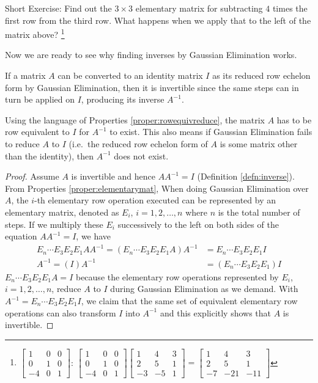 Short Exercise: Find out the $3 \times 3$ elementary matrix for subtracting $4$ times the first row from the third row. What happens when we apply that to the left of the matrix above? \footnote{$
\begin{bmatrix}
1 & 0 & 0 \\
0 & 1 & 0 \\
-4 & 0 & 1
\end{bmatrix}
$: $\begin{bmatrix}
1 & 0 & 0 \\
0 & 1 & 0 \\
-4 & 0 & 1
\end{bmatrix}
\begin{bmatrix}
1 & 4 & 3 \\
2 & 5 & 1 \\
-3 & -5 & 1
\end{bmatrix}
=
\begin{bmatrix}
1 & 4 & 3 \\
2 & 5 & 1 \\
-7 & -21 & -11
\end{bmatrix}
$}\par
Now we are ready to see why finding inverses by Gaussian Elimination works.
\begin{thm}
\label{thm:Gausselimprincip}
If a matrix $A$ can be converted to an identity matrix $I$ as its reduced row echelon form by Gaussian Elimination, then it is invertible since the same steps can in turn be applied on $I$, producing its inverse $A^{-1}$. 
\end{thm}
Using the language of Properties \ref{proper:rowequivreduce}, the matrix $A$ has to be row equivalent to $I$ for $A^{-1}$ to exist. This also means if Gaussian Elimination fails to reduce $A$ to $I$ (i.e.\ the reduced row echelon form of $A$ is some matrix other than the identity), then $A^{-1}$ does not exist.
\begin{proof}
Assume $A$ is invertible and hence $AA^{-1} = I$ (Definition \ref{defn:inverse}). From Properties \ref{proper:elementarymat}, When doing Gaussian Elimination over $A$, the $i$-th elementary row operation executed can be represented by an elementary matrix, denoted as $E_{i}$, $i = 1,2,\ldots,n$ where $n$ is the total number of steps. If we multiply these $E_{i}$ successively to the left on both sides of the equation $AA^{-1} = I$, we have
\begin{align*}
E_n \cdots E_{3}E_{2}E_{1} AA^{-1} = (E_n \cdots E_{3}E_{2}E_{1}A) A^{-1} &= E_n \cdots E_{3}E_{2}E_{1}I \\
A^{-1} = (I)A^{-1} &= (E_n \cdots E_{3}E_{2}E_{1})I
\end{align*}
$E_n \cdots E_{3}E_{2}E_{1}A = I$ because the elementary row operations represented by $E_i$, $i = 1,2,\ldots,n$, reduce $A$ to $I$ during Gaussian Elimination as we demand. With $A^{-1} = E_n \cdots E_{3}E_{2}E_{1}I$, we claim that the same set of equivalent elementary row operations can also transform $I$ into $A^{-1}$ and this explicitly shows that $A$ is invertible.    
\end{proof}
